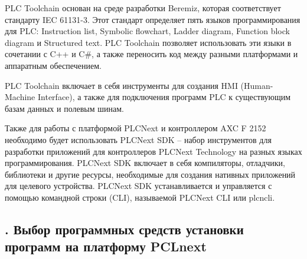 {	\par \redline PLC Toolchain основан на среде разработки Beremiz, которая соответствует стандарту IEC 61131-3. Этот стандарт определяет пять языков программирования для PLC: Instruction list, Symbolic flowchart, Ladder diagram, Function block diagram и Structured text. PLC Toolchain позволяет использовать эти языки в сочетании с C++ и C\#, а также переносить код между разными платформами и аппаратным обеспечением.
	
	\par \redline PLC Toolchain включает в себя инструменты для создания HMI (Human-Machine Interface), а также для подключения программ PLC к существующим базам данных и полевым шинам. 

	\par \redline Также для работы с платформой PLCNext и контроллером AXC F 2152 необходимо будет использовать PLCNext SDK – набор инструментов для разработки приложений для контроллеров PLCNext Technology на разных языках программирования. PLCNext SDK включает в себя компиляторы, отладчики, библиотеки и другие ресурсы, необходимые для создания нативных приложений для целевого устройства. PLCNext SDK устанавливается и управляется с помощью командной строки (CLI), называемой PLCNext CLI или plcncli.
	
	\par
}

\subtitlespace

\subsection*{ 
	\gostTitleFont
	\redline
	\thechaptercntr .\thesubchaptercntr \spc
	Выбор программных средств установки программ на платформу PCLnext
} \addtocounter{subchaptercntr}{1}

\subtitlespace

